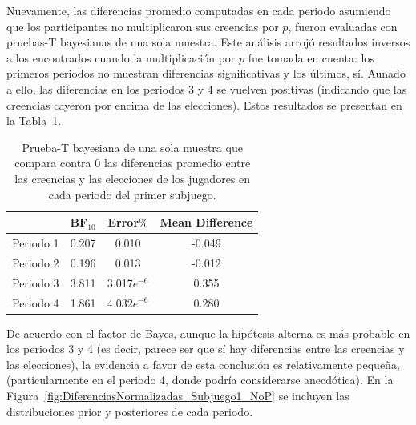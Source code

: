 Nuevamente, las diferencias promedio computadas en cada periodo asumiendo que los participantes no multiplicaron sus creencias por $p$, fueron evaluadas con pruebas-T bayesianas de una sola muestra.  Este análisis arrojó resultados inversos a los encontrados cuando la multiplicación por $p$ fue tomada en cuenta: los primeros periodos no muestran diferencias significativas y los últimos, sí.  Aunado a ello, las diferencias en los periodos 3 y 4 se vuelven positivas (indicando que las creencias cayeron por encima de las elecciones). Estos resultados se presentan en la Tabla~\ref{DN_Sub1_noP}.\\

\begin{table}
\caption[Diferencias Normalizadas en el Subjuego 1 (sin multiplicación por $p$)]{Prueba-T bayesiana de una sola muestra que compara contra 0 las diferencias promedio entre las creencias y las elecciones de los jugadores en cada periodo del primer subjuego.}
\label{DN_Sub1_noP}
\centering
\begin{tabular}{l | c c c}  %
\toprule
\textbf{} & \textbf{BF$_{10}$} & \textbf{Error$\%$} & \textbf{Mean Difference}\\
\midrule
Periodo 1 & 0.207 & 0.010 & -0.049 \\
Periodo 2 & 0.196 & 0.013 & -0.012 \\
Periodo 3 & 3.811 & 3.017$e^{-6}$ & 0.355 \\
Periodo 4 & 1.861 & 4.032$e^{-6}$ & 0.280 \\
\bottomrule
\end{tabular}
\end{table}

De acuerdo con el factor de Bayes, aunque la hipótesis alterna es más probable en los periodos 3 y 4 (es decir, parece ser que sí hay diferencias entre las creencias y las elecciones), la evidencia a favor de esta conclusión es relativamente pequeña, (particularmente en el periodo 4, donde podría considerarse anecdótica). En la Figura~\ref{fig:DiferenciasNormalizadas_Subjuego1_NoP} se incluyen las distribuciones prior y posteriores de cada periodo.\\

